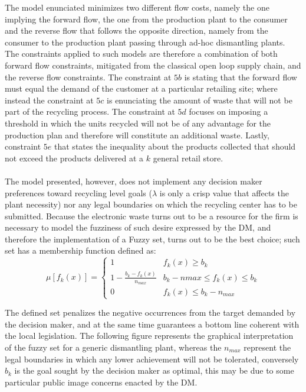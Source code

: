 \begin{doublespace}
The model enunciated minimizes two different flow costs, namely the one implying the forward flow, the one from the production plant to the consumer and the reverse flow that follows the opposite direction, namely from the consumer to the production plant passing through ad-hoc dismantling plants. The constraints applied to such models are therefore a combination of both forward flow constraints, mitigated from the classical open loop supply chain, and the reverse flow constraints. The constraint at $5b$ is stating that the forward flow must equal the demand of the customer at a particular retailing site; where instead the constraint at $5c$ is enunciating the amount of waste that will not be part of the recycling process. The constraint at $5d$ focuses on imposing a threshold in which the units recycled will not be of any advantage for the production plan and therefore will constitute an additional waste. Lastly, constraint $5e$ that states the inequality about the products collected that should not exceed the products delivered at a $k$ general retail store. 
\\
\\
The model presented, however, does not implement any decision maker preferences toward recycling level goals ($\lambda$ is only a crisp value that affects the plant necessity) nor any legal boundaries on which the recycling center has to be submitted. Because the electronic waste turns out to be a resource for the firm is necessary to model the fuzziness of such desire expressed by the DM, and therefore the implementation of a Fuzzy set\cite{Zadeh1965}, turns out to be the best choice; such set has a membership function defined as:
$$
\mu [f_k(x)]=
\begin{cases}
1 & f_k(x) \geq b_k \\
1-\frac{b_k-f_k(x)}{n_{max}} & b_k -n{max} \leq f_k(x) \leq b_k \\
0 & f_k(x) \leq b_k - n_{max}
\end{cases}
$$

The defined set penalizes the negative occurrences from the target demanded by the decision maker, and at the same time guarantees a bottom line coherent with the local legislation. The following figure represents the graphical interpretation of the fuzzy set for a generic dismantling plant, whereas the $n_{max}$ represent the legal boundaries in which any lower achievement will not be tolerated, conversely $b_k$ is the goal sought by the decision maker as optimal, this may be due to some particular public image concerns enacted by the DM. 


\end{doublespace}
